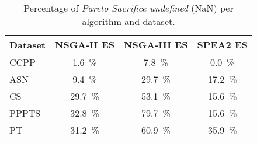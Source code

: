 \begin{table}[ht]
\centering
\caption{Percentage of \textit{Pareto Sacrifice undefined} (NaN) per algorithm and dataset.}
\label{tab:pareto_sacrifice_undefined_nsga-ii esnsga-iii esspea2 es}
\begin{tabular}{lccc}
\hline
Dataset & NSGA-II ES & NSGA-III ES & SPEA2 ES \\
\hline
CCPP & 1.6~\% & 7.8~\% & 0.0~\% \\
ASN & 9.4~\% & 29.7~\% & 17.2~\% \\
CS & 29.7~\% & 53.1~\% & 15.6~\% \\
PPPTS & 32.8~\% & 79.7~\% & 15.6~\% \\
PT & 31.2~\% & 60.9~\% & 35.9~\% \\
\hline
\end{tabular}
\end{table}